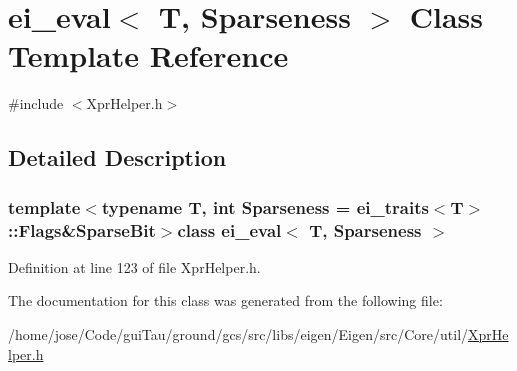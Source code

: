 \hypertarget{classei__eval}{\section{ei\-\_\-eval$<$ T, Sparseness $>$ Class Template Reference}
\label{classei__eval}
}


{\ttfamily \#include $<$Xpr\-Helper.\-h$>$}



\subsection{Detailed Description}
\subsubsection*{template$<$typename T, int Sparseness = ei\-\_\-traits$<$\-T$>$\-::\-Flags\&\-Sparse\-Bit$>$class ei\-\_\-eval$<$ T, Sparseness $>$}



Definition at line 123 of file Xpr\-Helper.\-h.



The documentation for this class was generated from the following file\-:\begin{DoxyCompactItemize}
\item 
/home/jose/\-Code/gui\-Tau/ground/gcs/src/libs/eigen/\-Eigen/src/\-Core/util/\hyperlink{_xpr_helper_8h}{Xpr\-Helper.\-h}\end{DoxyCompactItemize}
